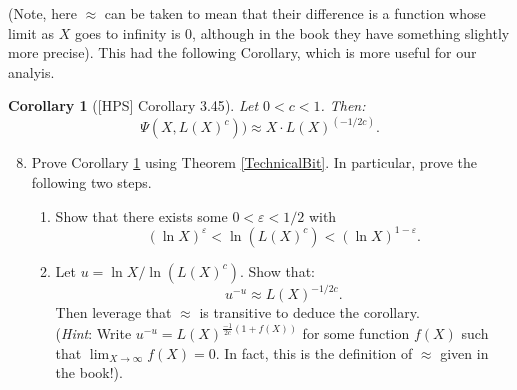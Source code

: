 \documentclass[11pt]{article}
\newtheorem{corollary}{Corollary}
\begin{document}
(Note, here $\approx$ can be taken to mean that their difference is a function whose limit as $X$ goes to infinity is $0$, although in the book they have something slightly more precise).  This had the following Corollary, which is more useful for our analyis.
\begin{corollary}[{[HPS] Corollary 3.45}]\label{technicalCorollary}
  Let $0<c<1$.  Then:
  \[\Psi(X,L(X)^c))\approx X\cdot L(X)^{(-1/2c)}.\]
\end{corollary}
\begin{enumerate}
  \setcounter{enumi}{7}
  \item{
  Prove Corollary \ref{technicalCorollary} using Theorem \ref{TechnicalBit}.  In particular, prove the following two steps.
  \begin{enumerate}
    \item{
      Show that there exists some $0<\varepsilon<1/2$ with
      \[(\ln X)^\varepsilon < \ln (L(X)^c) < (\ln X)^{1-\varepsilon}.\]
    }
    \item{
    Let $u = \ln X/\ln(L(X)^c)$.  Show that:
    \[u^{-u}\approx L(X)^{-1/2c}.\]
    Then leverage that $\approx$ is transitive to deduce the corollary.\\ (\textit{Hint}: Write $u^{-u} = L(X)^{\frac{-1}{2c}(1+f(X))}$ for some function $f(X)$ such that $\lim_{X\to\infty} f(X) = 0$.  In fact, this is the definition of $\approx$ given in the book!).
    }
  \end{enumerate}
  }
\end{enumerate}
\end{document}
